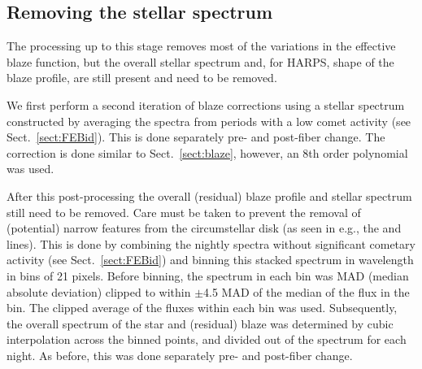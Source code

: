 \documentclass{aa}
\begin{document}
\subsection{Removing the stellar spectrum}\label{sect:starcor}
The processing up to this stage removes most of the variations in the effective blaze function, but the overall stellar spectrum and, for HARPS, shape of the blaze profile, are still present and need to be removed. 

We first perform a second iteration of blaze corrections using a stellar spectrum constructed by averaging the spectra from periods with a low comet activity (see Sect.~\ref{sect:FEBid}). %
This is done separately pre- and post-fiber change. The correction is done similar to Sect.~\ref{sect:blaze}, however, %
an 8th order polynomial was used.

After this post-processing the overall (residual) blaze profile and stellar spectrum still need to be removed. Care must be taken to prevent the removal of (potential) narrow features from the circumstellar disk (as seen in e.g., the  and  lines). This is done by combining the nightly spectra without significant cometary activity (see Sect.~\ref{sect:FEBid}) and binning this stacked spectrum in wavelength in bins of 21 pixels. Before binning, the spectrum in each bin was MAD (median absolute deviation) clipped to within $\pm$4.5 MAD of the median of the flux in the bin. The clipped average of the fluxes within each bin was used. Subsequently, the overall spectrum of the star and (residual) blaze was determined by cubic interpolation across the binned points, and divided out of the spectrum for each night. As before, this was done separately pre- and post-fiber change.




%
%

%
\end{document}
